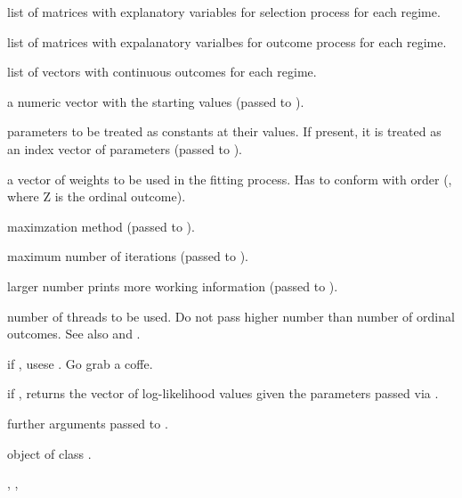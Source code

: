 \begin{Arguments}
\begin{ldescription}
\item[\code{Ws}] list of matrices with explanatory variables for selection process for each regime.

\item[\code{Xs}] list of matrices with expalanatory varialbes for outcome process for each regime.

\item[\code{Ys}] list of vectors with continuous outcomes for each regime.

\item[\code{start}] a numeric vector with the starting values (passed to ).

\item[\code{fixed}] parameters to be treated as constants at their  values. If
present, it is treated as an index vector of  parameters (passed to ).

\item[\code{weights}] a vector of weights to be used in the fitting process. Has to
conform with order (, where Z is the ordinal
outcome).

\item[\code{method}] maximzation method (passed to ).

\item[\code{iterlim}] maximum number of iterations (passed to ).

\item[\code{printLevel}] larger number prints more working information (passed to ).

\item[\code{nThreads}] number of threads to be used. Do not pass higher number than
number of ordinal outcomes. See also  and .

\item[\code{.useR}] if , usese . Go grab a coffe.

\item[\code{.loglik}] if , returns the vector of log-likelihood values given
the parameters passed via .

\item[\code{...}] further arguments passed to .
\end{ldescription}
\end{Arguments}
%
\begin{Value}
object of class .
\end{Value}
%
\begin{SeeAlso}
, , 
\end{SeeAlso}


